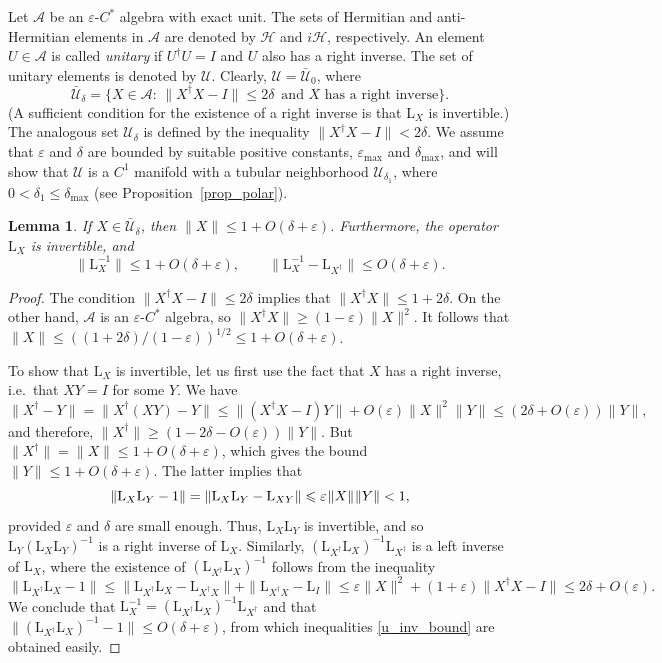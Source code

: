 \documentclass[12pt]{article}
\newcommand{\calA}{\mathcal{A}}
\newcommand{\calH}{\mathcal{H}}
\newcommand{\calU}{\mathcal{U}}
\newcommand{\ts}{\mkern1mu}
\newcommand{\La}{\mathrm{L}}
\newcommand{\eps}{\varepsilon}
\renewcommand{\le}{\leqslant}
\renewcommand{\ge}{\geqslant}
\newtheorem{Lemma}[Theorem]{Lemma}
\newtheorem[definition]{Definition}[Theorem]{Definition}
\newtheorem[remark]{Example}[Theorem]{Example}
\newtheorem[remark]{Remark}[Theorem]{Remark}
\newtheorem[remark]{Question}[Theorem]{Open question}
\newtheorem*[definition]{definition}{Definition}
\newtheorem*[remark]{example}{Example}
\newtheorem*[remark]{remark}{Remark}
\newtheorem*[remark]{question}{Open question}
\numberwithin{equation}{section}
\begin{document}
Let $\calA$ be an $\eps$-$C^*$ algebra with exact unit. The sets of Hermitian and anti-Hermitian elements in $\calA$ are denoted by $\calH$ and $i\calH$, respectively. An element $U\in\calA$ is called \emph{unitary} if $U^{\dag}U=I$ and $U$ also has a right inverse. The set of unitary elements is denoted by $\calU$. Clearly, $\calU=\bar{\calU}_0$, where
\begin{equation}\label{U_delta}
\bar{\calU}_\delta=\bigl\{X\in\calA:\, \|X^\dag X-I\|\le 2\delta\,
\text{ and $X$ has a right inverse}\bigr\}.
\end{equation}
(A sufficient condition for the existence of a right inverse is that $\La_X$ is invertible.) The analogous set $\calU_\delta$ is defined by the inequality $\|X^{\dag}X-I\|<2\delta$. We assume that $\eps$ and $\delta$ are bounded by suitable positive constants, $\eps_{\max}$ and $\delta_{\max}$, and will show that $\calU$ is a $C^1$ manifold with a tubular neighborhood $\calU_{\delta_1}$, where $0<\delta_1\le\delta_{\max}$ (see Proposition~\ref{prop_polar}).

\begin{Lemma}\label{lem_U_delta}
If $X\in\bar{\calU}_\delta$, then $\|X\|\le 1+O(\delta+\eps)$. Furthermore, the operator $\La_X$ is invertible, and
\begin{equation}
\label{u_inv_bound}
\|\La_X^{-1}\|\le 1+O(\delta+\eps),\qquad
\|\La_X^{-1}-\La_{X^\dag}\| \le O(\delta+\eps).
\end{equation}
\end{Lemma}
\begin{proof}
The condition $\|X^{\dag}X-I\|\le 2\delta$ implies that $\|X^{\dag}X\|\le 1+2\delta$. On the other hand, $\calA$ is an $\eps$-$C^*$ algebra, so $\|X^{\dag}X\|\ge (1-\eps)\|X\|^2$. It follows that $\|X\|\le ((1+2\delta)/(1-\eps))^{1/2}\le 1+O(\delta+\eps)$.

To show that $\La_X$ is invertible, let us first use the fact that $X$ has a right inverse, i.e.\ that $XY=I$ for some $Y$. We have
\[
\|X^\dag-Y\|=\|X^{\dag}(XY)-Y\|\le \|(X^{\dag}X-I)Y\|+O(\eps)\|X\|^2\|Y\|
\le (2\delta+O(\eps))\|Y\|,
\]
and therefore, $\|X^\dag\|\ge (1-2\delta-O(\eps))\|Y\|$. But $\|X^\dag\|=\|X\|\le 1+O(\delta+\eps)$, which gives the bound $\|Y\|\le 1+O(\delta+\eps)$. The latter implies that
\[
\|\La_X\La_Y-1\|=\|\La_X\La_Y-\La_{XY}\|\le \eps\ts\|X\|\ts\|Y\| <1,
\]
provided $\eps$ and $\delta$ are small enough. Thus, $\La_X\La_Y$ is invertible, and so $\La_Y(\La_X\La_Y)^{-1}$ is a right inverse of $\La_X$. Similarly, $(\La_{X^\dag}\La_X)^{-1}\La_{X^\dag}$ is a left inverse of $\La_X$, where the existence of $(\La_{X^\dag}\La_X)^{-1}$ follows from the inequality
\[
\|\La_{X^\dag}\La_X-1\|\le
\|\La_{X^\dag}\La_X-\La_{X^{\dag}X}\|+\|\La_{X^{\dag}X}-\La_{I}\|
\le \eps\|X\|^2+(1+\eps)\|X^{\dag}X-I\| \le 2\delta+O(\eps).
\]
We conclude that $\La_X^{-1}=(\La_{X^\dag}\La_X)^{-1}\La_{X^\dag}$ and that $\|(\La_{X^\dag}\La_X)^{-1}-1\|\le O(\delta+\eps)$, from which inequalities \eqref{u_inv_bound} are obtained easily.
\end{proof}
\end{document}
